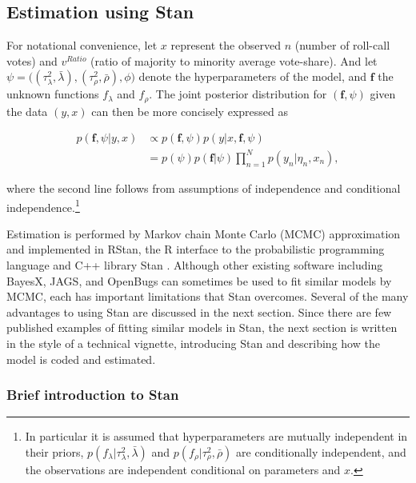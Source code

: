  \subsection{Estimation using Stan}
 \label{stan_intro}

For notational convenience, let $x$ represent the observed $n$ (number of roll-call votes) 
and $v^{Ratio}$ (ratio of majority to minority average vote-share).  And let 
$\psi = \big((\tau^2_\lambda, \bar{\lambda}), (\tau^2_\rho, \bar{\rho}), \phi \big)$ denote 
the hyperparameters of the model, and $\bm{f}$ the unknown functions  $f_\lambda$ and 
$f_\rho$. The joint posterior distribution for $(\bm{f}, \psi)$ given the data $(y, x)$ can then 
be more concisely expressed as 

\begin{align*}
p(\bm{f}, \psi | y, x) 
&\propto p(\bm{f}, \psi)  p(y | x, \bm{f}, \psi)  \\
&=p(\psi)  p(\bm{f} | \psi)   \prod_{n=1}^N p(y_n | \eta_n, x_n), 
\end{align*}

\noindent where the second line follows from assumptions of independence and conditional 
independence.\footnote{In particular it is assumed that hyperparameters are mutually independent 
in their priors, $p(f_\lambda | \tau^2_\lambda, \bar{\lambda})$ and $p(f_\rho | \tau^2_\rho, \bar{\rho})$ 
are conditionally independent, and the observations are independent conditional on parameters 
and $x$.}

Estimation is performed by Markov chain Monte Carlo (MCMC) approximation and implemented in 
RStan, the R interface to the probabilistic programming language and C++ library Stan 
. Although other existing software including BayesX, JAGS, and 
OpenBugs can sometimes be used to fit similar models by MCMC, each has important limitations 
that Stan overcomes. Several of the many advantages to using Stan are discussed in the next section. 
Since there are few published examples of fitting similar models in Stan, the next section is 
written in the style of a technical vignette, introducing Stan and describing how the model is coded 
and estimated. 

\subsubsection{Brief introduction to Stan}


